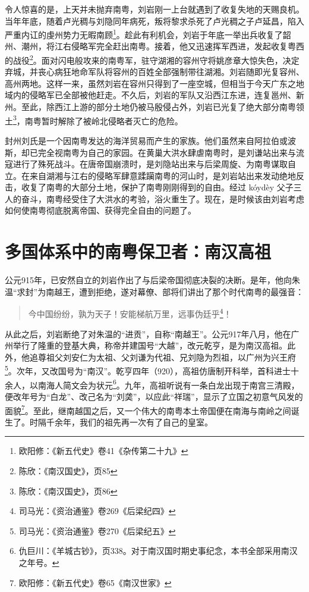 令人惊喜的是，上天并未抛弃南粤，刘岩刚一上台就遇到了收复失地的天赐良机。当年年底，随着卢光稠与刘隐同年病死，叛将黎求杀死了卢光稠之子卢延昌，陷入严重内讧的虔州势力无暇南顾\footnote{欧阳修：《新五代史》卷41《杂传第二十九》}。趁此有利机会，刘岩于年底一举出兵收复了韶州、潮州，将江右侵略军完全赶出南粤。接着，他又迅速挥军西进，发起收复粤西的战役\footnote{陈欣：《南汉国史》，页85}。面对闪电般攻来的南粤军，驻守湖湘的容州守将姚彦章大惊失色，决定弃城，并丧心病狂地命军队将容州的百姓全部强制带往湖湘。刘岩随即光复容州、高州两地。这样一来，虽然刘岩在容州只得到了一座空城，但相当于今天广东之地域内的侵略军已全部被他赶走。不久后，刘岩的军队又沿西江东进，连复邕州、新州。至此，除西江上游的部分土地仍被马殷侵占外，刘岩已光复了绝大部分南粤领土\footnote{陈欣：《南汉国史》，页86}，南粤暂时解除了被岭北侵略者灭亡的危险。

封州刘氏是一个因南粤发达的海洋贸易而产生的家族。他们虽然来自阿拉伯或波斯，却已完全视南粤为自己的家园。在黄巢大洪水肆虐南粤时，是刘谦站出来与流寇进行了殊死战斗。在唐帝国崩溃时，是刘隐站出来与后梁周旋、为南粤谋取自立。在来自湖湘与江右的侵略军肆意蹂躏南粤的河山时，是刘岩站出来发动绝地反击，收复了南粤的大部分土地，保护了南粤刚刚得到的自由。经过 kóydèy 父子三人的奋斗，南粤经受住了大洪水的考验，浴火重生了。现在，是时候该由刘岩考虑如何使南粤彻底脱离帝国、获得完全自由的问题了。


\section{多国体系中的南粤保卫者：南汉高祖}

\indent 公元915年，已安然自立的刘岩作出了与后梁帝国彻底决裂的决断。是年，他向朱温“求封”为南越王，遭到拒绝，遂对幕僚、部将们讲出了那个时代南粤的最强音：

\begin{quote}
	
今中国纷纷，孰为天子！安能梯航万里，远事伪廷乎\footnote{司马光：《资治通鉴》卷269《后梁纪四》}！

\end{quote}

从此之后，刘岩断绝了对朱温的“进贡”，自称“南越王”。公元917年八月，他在广州举行了隆重的登基大典，称帝并建国号“大越”，改元乾亨，是为南汉高祖。此外，他追尊祖父刘安仁为太祖、父刘谦为代祖、兄刘隐为烈祖，以广州为兴王府\footnote{司马光：《资治通鉴》卷270《后梁纪五》}。次年，又改国号为“南汉”。乾亨四年（920），高祖仿唐制开科举，首科进士十余人，以南海人简文会为状元\footnote{仇巨川：《羊城古钞》，页338。对于南汉国时期史事纪念，本书全部采用南汉之年号。}。九年，高祖听说有一条白龙出现于南宫三清殿，便改年号为“白龙”、改己名为“刘䶮”，以应此“祥瑞”，显示了立国之初意气风发的面貌\footnote{欧阳修：《新五代史》卷65《南汉世家》}。至此，继南越国之后，又一个伟大的南粤本土帝国便在南海与南岭之间诞生了。时隔千余年，我们的祖先再一次有了自己的皇室。

